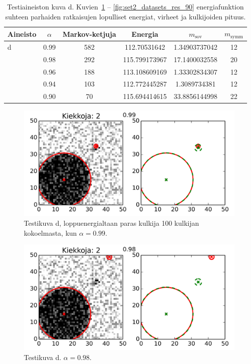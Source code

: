 \begin{table}[htpb]
    \centering
    \caption{Testiaineiston kuva d. Kuvien~\ref{fig:set2_datasets_res_99} -- \ref{fig:set2_datasets_res_90} energiafunktion suhteen parhaiden ratkaisujen lopulliset energiat, virheet ja kulkijoiden pituus.
        \label{tab:2_res_errors}
    }
    \begin{tabular}{l c c c c c}
        Aineisto & $\alpha$ & Markov-ketjuja & Energia & $m_\text{sov}$ & $m_\text{symm}$ \\[2pt]
        \hline\noalign{\smallskip}
        d & 0.99 & 582 & 112.70531642  & 1.34903737042 & 12 \\
          & 0.98 & 292 & 115.799173967 & 17.1400032558 & 20 \\
          & 0.96 & 188 & 113.108609169 & 1.33302834307 & 12 \\
          & 0.94 & 103 & 112.772445287 & 1.3089734381  & 12 \\
          & 0.90 & 70  & 115.694414615 & 33.8856144998 & 22 \\
    \end{tabular}
\end{table}

\begin{figure}[p]
    \centering
    \includegraphics[width=0.7\linewidth]{figures/set2_datasets_res_99.png}
    \caption{Testikuva d, loppuenergialtaan paras kulkija 100 kulkijan kokoelmasta, kun $\alpha = 0.99$.
        \label{fig:set2_datasets_res_99}
    }
\end{figure}

\begin{figure}[p]
    \centering
    \includegraphics[width=0.7\linewidth]{figures/set2_datasets_res_98.png}
    \caption{Testikuva d. $\alpha = 0.98$.
        \label{fig:set2_datasets_res_98}
    }
\end{figure}


